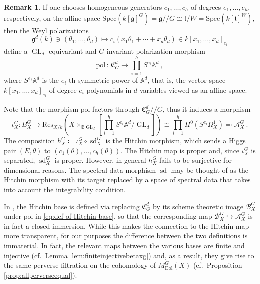 \documentclass[11pt, a4paper]{amsart}
\theoremstyle{definition}
\newtheorem{remark}[theorem]{Remark}
\theoremstyle{myitemstyle}
\newcommand{\A}{\mathbb{A}}
\DeclareMathOperator{\GL}{GL}
\newcommand{\Dol}{{\mathrm{Dol}}}
\newcommand{\sd}{{\operatorname{sd}}}
\begin{document}
\begin{remark}
If one chooses homogeneous generators $c_1,\ldots, c_h$ of degrees $e_1,\ldots, e_h$, respectively,  on the affine space $\mathrm{Spec} (k[\mathfrak{g}]^G)=\mathfrak g/\!\!/G\cong \mathfrak t/W=\mathrm{Spec}(k[\mathfrak{t}]^W)$,  then the Weyl polarizations 
\[
    \mathfrak g^d(k)\ni(\theta_1,\ldots, \theta_d)\mapsto c_i(x_1\theta_1+\cdots+x_d \theta_d)\in k[x_1,\ldots, x_d]_{e_i}
\]
define a $\GL_d$-equivariant  and $G$-invariant polarization morphism
\[
    \mathrm{pol}\,\colon\, \mathfrak C^d_G\to \prod_{i=1}^h S^{e_i}\A^d\ ,
\]
where $S^{e_i}\A^d$ is the $e_i$-th symmetric power of $\A^d$, that is, the vector space $k[x_1,\ldots, x_d]_{e_i}$ of degree $e_i$ polynomials in $d$ variables viewed as an affine space.

Note that the morphism $\mathrm{pol}$ factors through $\mathfrak{C}^d_G/\!\!/G$, thus it induces a morphism 
\[
    \iota_X^G\colon B^G_X\rightarrow 
        \mathrm{Res}_{X/k}\left( X\times_{\mathbb{B}\GL_d}\left[\prod_{i=1}^h S^{e_i}\A^d \Big/\GL_d \right]\right)\cong
            \prod_{i=1}^h H^0(S^{e_i}\Omega^1_X) 
                \eqqcolon\mathcal{A}^G_X\ .
\]
The composition $h_X^G\coloneqq\iota_X^G\circ \sd_X^G$ is the Hitchin morphism, which sends a Higgs pair $(E,\theta)$ to $(c_1(\theta),\ldots, c_h(\theta))$.
The Hitchin map is proper \cite{SimI} and, since $\iota_X^G$ is separated, $\sd_X^G$ is proper.
However, in general $h_X^G$ fails to be surjective for dimensional reasons. The spectral data morphism $\sd$ may be thought of as the Hitchin morphism with its target replaced by a space of spectral data that takes into account the integrability condition.

In \cite{CN20}, the Hitchin base is defined via  replacing $\mathfrak{C}^d_G$ by its scheme theoretic image $\mathcal{B}^G_X$ under $\mathrm{pol}$ in \eqref{eq:def of Hitchin base}, so that the corresponding map $\mathcal{B}^G_X\hookrightarrow \mathcal{A}^G_X$ is in fact a closed immersion. While this makes the connection to the Hitchin map more transparent, for our purposes the difference between the two definitions is immaterial. In fact, the relevant maps between the various bases are finite and injective (cf.\ Lemma \ref{lem:finiteinjectivebetaxg}) and, as a result, they give rise to the same perverse filtration on the cohomology of $M_{\Dol}^G(X)$ (cf.\ Proposition \ref{prop:allperverseequal}).
\end{remark}
\end{document}

